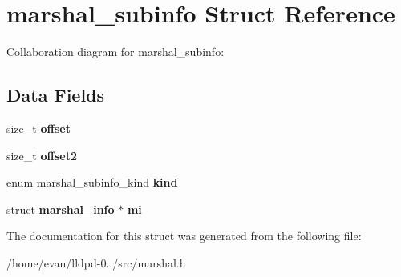 \section{marshal\-\_\-subinfo \-Struct \-Reference}
\label{structmarshal__subinfo}


\-Collaboration diagram for marshal\-\_\-subinfo\-:
\subsection*{\-Data \-Fields}
\begin{DoxyCompactItemize}
\item 
size\-\_\-t {\bfseries offset}\label{structmarshal__subinfo_aadb6d6eb83e646653a1402032e45dcab}

\item 
size\-\_\-t {\bfseries offset2}\label{structmarshal__subinfo_a776282ae66e3151369bb3e17c8fa12ba}

\item 
enum marshal\-\_\-subinfo\-\_\-kind {\bfseries kind}\label{structmarshal__subinfo_aa6b9b1d373b01774509dcf27bb8f47b8}

\item 
struct {\bf marshal\-\_\-info} $\ast$ {\bfseries mi}\label{structmarshal__subinfo_a3ea521286549efcfd0b5e0618c6afa58}

\end{DoxyCompactItemize}


\-The documentation for this struct was generated from the following file\-:\begin{DoxyCompactItemize}
\item 
/home/evan/lldpd-\/0../src/marshal.\-h\end{DoxyCompactItemize}

